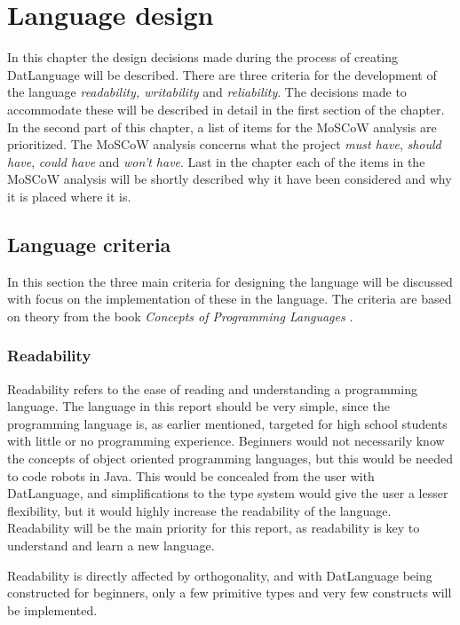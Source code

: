 \chapter{Language design}
\label{chap:LanguageDesign}
In this chapter the design decisions made during the process of creating DatLanguage will be described. There are three criteria for the development of the language \emph{readability, writability} and \emph{reliability}. The decisions made to accommodate these will be described in detail in the first section of the chapter. In the second part of this chapter, a list of items for the MoSCoW analysis are prioritized. The MoSCoW analysis concerns what the project \textit{must have}, \textit{should have}, \textit{could have} and \textit{won't have}. Last in the chapter each of the items in the MoSCoW analysis will be shortly described why it have been considered and why it is placed where it is.
 
\section{Language criteria}
In this section the three main criteria for designing the language will be discussed with focus on the implementation of these in the language. The criteria are based on theory from the book \emph{Concepts of Programming Languages} \citep{Sebesta}.

\subsection{Readability}
Readability refers to the ease of reading and understanding a programming language. The language in this report should be very simple, since the programming language is, as earlier mentioned, targeted for high school students with little or no programming experience. Beginners would not necessarily know the concepts of object oriented programming languages, but this would be needed to code robots in Java. This would be concealed from the user with DatLanguage, and simplifications to the type system would give the user a lesser flexibility, but it would highly increase the readability of the language. Readability will be the main priority for this report, as readability is key to understand and learn a new language.

Readability is directly affected by orthogonality, and with DatLanguage being constructed for beginners, only a few primitive types and very few constructs will be implemented.

